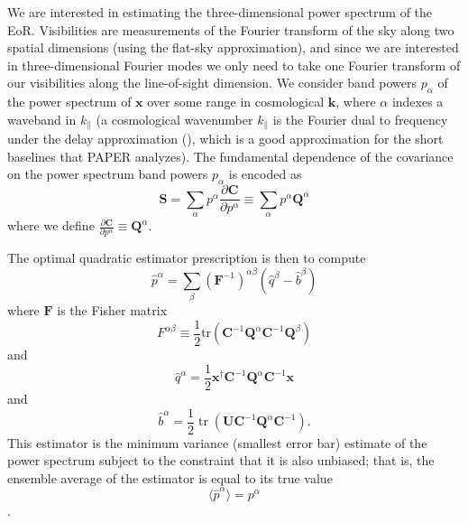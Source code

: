 \documentclass[preprint2,numberedappendix,tighten]{aastex6}  %
\newcommand{\C}{\mathbf{C}}
\newcommand{\F}{\mathbf{F}}
\newcommand{\invC}{\ensuremath{\C^{-1}}}
\DeclareMathOperator{\Tr}{tr}
\newcommand{\half}{\ensuremath{\frac{1}{2}}}
\begin{document}
We are interested in estimating the three-dimensional power spectrum of the EoR.  
Visibilities are measurements of the Fourier transform of the sky along two spatial dimensions (using the flat-sky approximation), and since we are interested in three-dimensional Fourier modes we only need to take one Fourier transform of our visibilities along the line-of-sight dimension.  We consider band powers $p_\alpha$ of the power spectrum of $\textbf{x}$ over some range in cosmological $\mathbf{k}$, where $\alpha$ indexes a waveband in $k_{\parallel}$ (a cosmological wavenumber $k_{\parallel}$ is the Fourier dual to frequency under the delay approximation (\citealt{parsons_et_al2012b}), which is a good approximation for the short baselines that PAPER analyzes).  The fundamental dependence of the covariance on the power spectrum band powers $p_\alpha$ is encoded as 
\begin{equation}
\textbf{S} = \sum_\alpha p^\alpha \frac{\partial\textbf{C}}{\partial p^\alpha} \equiv \sum_\alpha p^\alpha \textbf{Q}^\alpha
\end{equation}
where we define $\frac{\partial\textbf{C}}{\partial p^\alpha} \equiv \textbf{Q}^{\alpha}$.

The optimal quadratic estimator prescription is then to compute
\begin{equation}
\label{eq:OQE}
\widehat{p}^{\alpha}  = \sum_\beta ({\F^{-1}})^{\alpha\beta} (\widehat{q}^{\beta} - \widehat{b}^{\beta} )
\end{equation}
where $\F$ is the Fisher matrix 
\begin{equation}
F^{\alpha \beta} \equiv \frac{1}{2} \textrm{tr} \left( \C^{-1} \textbf{Q}^{\alpha} \C^{-1} \textbf{Q}^{\beta} \right)
\end{equation}
and
\begin{equation}
\label{eq:OQEQuadratic}
\widehat{q}^\alpha =  \half \textbf{x}^\dagger \invC \textbf{Q}^{\alpha}  \invC \textbf{x} 
\end{equation}
and
\begin{equation}
\label{eq:OQELinear}
\widehat{b}^{\alpha} = \half \Tr\left( \mathbf{U} \invC \textbf{Q}^{\alpha} \invC \right).
\end{equation}
This estimator is the minimum variance (smallest error bar) estimate of the power spectrum  subject to the constraint that it is also unbiased; that is, the ensemble average of the estimator is equal to its true value
\begin{equation}
\label{eq:super_unbiased}
\langle \widehat{p}^{\alpha} \rangle = p^\alpha
\end{equation}
\citep{tegmark_et_al1997a,bond_et_al1998}.
\end{document}
